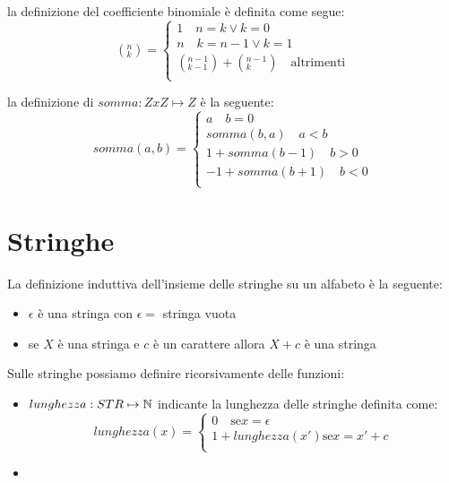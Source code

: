 la definizione del coefficiente binomiale è definita come segue:
\begin{equation*}
    (^n _ k) = \begin{cases} 1 \quad n = k \lor k = 0 \\
                             n \quad k = n-1 \lor k = 1 \\
                             (^{n-1} _{k-1}) + (^{n-1} _k) \quad \text{altrimenti} \\
                \end{cases}
\end{equation*}

la definizione di $somma:Z x Z \mapsto Z$ è la seguente:
\begin{equation*}
    somma(a,b) = \begin{cases} a \quad b = 0 \\
                               somma(b,a) \quad a < b \\
                               1 + somma(b-1) \quad b > 0\\
                               -1 + somma(b+1) \quad b < 0 \\
                  \end{cases}
\end{equation*}

\section{Stringhe}
La definizione induttiva dell'insieme delle stringhe su un alfabeto è la seguente:
\begin{itemize}
    \item $\epsilon$ è una stringa con $\epsilon = $ stringa vuota
    \item se $X$ è una stringa e $c$ è un carattere allora $X+c$ è una stringa
\end{itemize}

Sulle stringhe possiamo definire ricorsivamente delle funzioni:
\begin{itemize}
    \item $lunghezza:STR \mapsto \mathbb{N}$ indicante la lunghezza delle stringhe definita come:
            \begin{equation*}
                lunghezza(x) = \begin{cases} 0 \quad \text{se} x = \epsilon \\
                                             1 + lunghezza(x') \text{se} x = x' + c \\
                                \end{cases}
            \end{equation*}
    \item
\end{itemize}

